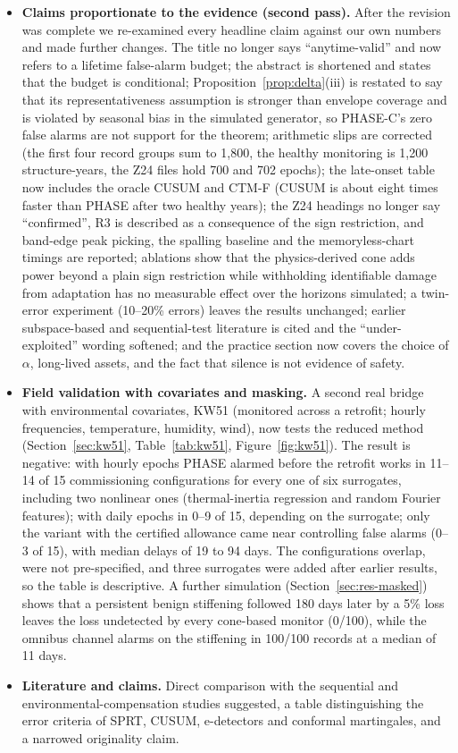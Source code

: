 \documentclass[11pt,a4paper]{article}
\newcommand{\sref}[1]{Section~\ref{#1}}
\newcommand{\tref}[1]{Table~\ref{#1}}
\newcommand{\fref}[1]{Figure~\ref{#1}}
\newcommand{\pref}[1]{Proposition~\ref{#1}}
\begin{document}
\begin{itemize}
\item \textbf{Claims proportionate to the evidence (second pass).} After the revision was complete we re-examined every headline claim against our own numbers and made further changes. The title no longer says ``anytime-valid'' and now refers to a lifetime false-alarm budget; the abstract is shortened and states that the budget is conditional; \pref{prop:delta}(iii) is restated to say that its representativeness assumption is stronger than envelope coverage and is violated by seasonal bias in the simulated generator, so PHASE-C's zero false alarms are not support for the theorem; arithmetic slips are corrected (the first four record groups sum to 1{,}800, the healthy monitoring is 1{,}200 structure-years, the Z24 files hold 700 and 702 epochs); the late-onset table now includes the oracle CUSUM and CTM-F (CUSUM is about eight times faster than PHASE after two healthy years); the Z24 headings no longer say ``confirmed'', R3 is described as a consequence of the sign restriction, and band-edge peak picking, the spalling baseline and the memoryless-chart timings are reported; ablations show that the physics-derived cone adds power beyond a plain sign restriction while withholding identifiable damage from adaptation has no measurable effect over the horizons simulated; a twin-error experiment (10--20\% errors) leaves the results unchanged; earlier subspace-based and sequential-test literature is cited and the ``under-exploited'' wording softened; and the practice section now covers the choice of $\alpha$, long-lived assets, and the fact that silence is not evidence of safety.
\item \textbf{Field validation with covariates and masking.} A second real bridge with environmental covariates, KW51 (monitored across a retrofit; hourly frequencies, temperature, humidity, wind), now tests the reduced method (\sref{sec:kw51}, \tref{tab:kw51}, \fref{fig:kw51}). The result is negative: with hourly epochs PHASE alarmed before the retrofit works in 11--14 of 15 commissioning configurations for every one of six surrogates, including two nonlinear ones (thermal-inertia regression and random Fourier features); with daily epochs in 0--9 of 15, depending on the surrogate; only the variant with the certified allowance came near controlling false alarms (0--3 of 15), with median delays of 19 to 94 days. The configurations overlap, were not pre-specified, and three surrogates were added after earlier results, so the table is descriptive. A further simulation (\sref{sec:res-masked}) shows that a persistent benign stiffening followed 180 days later by a 5\% loss leaves the loss undetected by every cone-based monitor (0/100), while the omnibus channel alarms on the stiffening in 100/100 records at a median of 11 days.
\item \textbf{Literature and claims.} Direct comparison with the sequential and environmental-compensation studies suggested, a table distinguishing the error criteria of SPRT, CUSUM, e-detectors and conformal martingales, and a narrowed originality claim.
\end{itemize}
\end{document}
